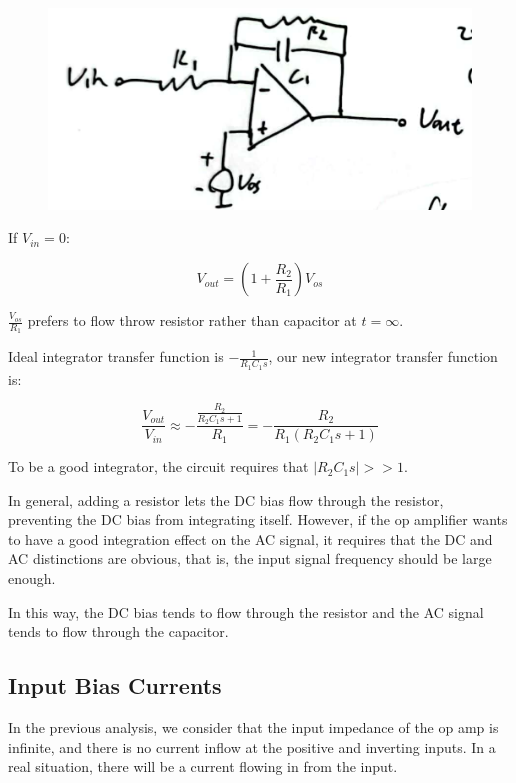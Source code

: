 \documentclass[fontset=windows]{article}
\begin{document}
\begin{figure}[htbp]
    \centering
    \includegraphics[scale=0.8]{11.jpg}
    \captionsetup{labelformat=empty}
    \caption{}
    \label{11}
\end{figure}

If $V_{in}=0$: 

$$V_{out}=(1+\frac{R_2}{R_1})V_{os}$$

$\frac{V_{os}}{R_1}$ prefers to flow throw resistor rather than capacitor at $t=\infty$. 

Ideal integrator transfer function is $-\frac{1}{R_1C_1s}$, our new integrator transfer function is: 

$$\frac{V_{out}}{V_{in}}\approx -\frac{\frac{R_2}{R_2C_1s+1}}{R_1}=-\frac{R_2}{R_1(R_2C_1s+1)}$$

To be a good integrator, the circuit requires that $|R_2C_1s|>>1$. 

In general, adding a resistor lets the DC bias flow through the resistor, preventing the DC bias from integrating itself. However, if the op amplifier wants to have a good integration effect on the AC signal, it requires that the DC and AC distinctions are obvious, that is, the input signal frequency should be large enough. 

In this way, the DC bias tends to flow through the resistor and the AC signal tends to flow through the capacitor. 

\subsection*{Input Bias Currents}

In the previous analysis, we consider that the input impedance of the op amp is infinite, and there is no current inflow at the positive and inverting inputs. In a real situation, there will be a current flowing in from the input. 
\end{document}
